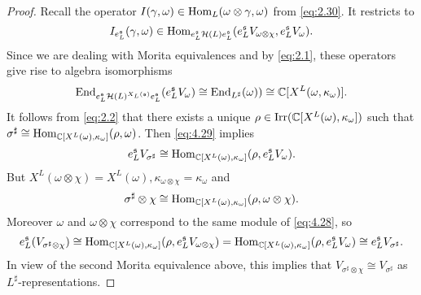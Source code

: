 \documentclass[11pt]{amsart}
\theoremstyle{definition}
\begin{document}
\begin{proof}
Recall the operator $I(\gamma,\omega) \in {{\rm Hom}}_L (\omega \otimes \gamma,\omega)$ 
from \eqref{eq:2.30}. It restricts to 
\[
I_{e^{{\mathfrak s}}_L} (\gamma,\omega) \in {{\rm Hom}}_{e^{{\mathfrak s}}_L {{\mathcal H}} (L) e^{{\mathfrak s}}_L} 
(e^{{\mathfrak s}}_L V_{\omega \otimes \chi}, e^{{\mathfrak s}}_L V_\omega ) .
\]
Since we are dealing with Morita equivalences and by \eqref{eq:2.1}, 
these operators give rise to algebra isomorphisms
\begin{equation}\label{eq:4.29}
{{\rm End}}_{e^{{\mathfrak s}}_L {{\mathcal H}} (L)^{X_L ({{\mathfrak s}})} e^{{\mathfrak s}}_L} 
(e^{{\mathfrak s}}_L V_\omega) 
\cong {{\rm End}}_{L^\sharp} (\omega)) \cong {\mathbb C} [X^L (\omega,\kappa_\omega)] .
\end{equation}
It follows from \eqref{eq:2.2} that there exists a unique 
$\rho \in {{\rm Irr}} ({\mathbb C} [X^L(\omega), \kappa_\omega])$ such that
$\sigma^\sharp \cong {{\rm Hom}}_{{\mathbb C} [X^L(\omega),\kappa_\omega]}(\rho,\omega)$. 
Then \eqref{eq:4.29} implies
\[
e^{{\mathfrak s}}_L V_{\sigma^\sharp} \cong 
{{\rm Hom}}_{{\mathbb C} [X^L(\omega),\kappa_\omega]}(\rho,e^{{\mathfrak s}}_L V_\omega) .
\]
But $X^L (\omega \otimes \chi) = 
X^L (\omega), \kappa_{\omega \otimes \chi} = \kappa_\omega$ and
\[
\sigma^\sharp \otimes \chi \cong 
{{\rm Hom}}_{{\mathbb C} [X^L(\omega),\kappa_\omega]}(\rho,\omega \otimes \chi) .
\]
Moreover $\omega$ and $\omega \otimes \chi$ correspond 
to the same module of \eqref{eq:4.28}, so
\[
e^{{\mathfrak s}}_L (V_{\sigma^\sharp \otimes \chi}) \cong 
{{\rm Hom}}_{{\mathbb C} [X^L(\omega),\kappa_\omega]}(\rho,e^{{\mathfrak s}}_L V_{\omega \otimes \chi}) =
{{\rm Hom}}_{{\mathbb C} [X^L(\omega),\kappa_\omega]}(\rho,e^{{\mathfrak s}}_L V_{\omega}) \cong
e^{{\mathfrak s}}_L V_{\sigma^\sharp} .
\]
In view of the second Morita equivalence above, this implies that 
$V_{\sigma^\sharp \otimes \chi} \cong V_{\sigma^\sharp}$ as $L^\sharp$-representations.
\end{proof}
\end{document}
